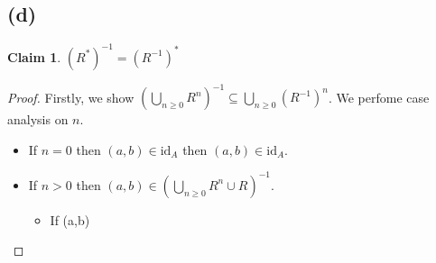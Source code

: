 \documentclass[autodetect-enginem]{article}
\theoremstyle{plain}
\theoremstyle{definition}
\theoremstyle{definition}
\newtheorem{claim}{Claim}
\begin{document}
\subsection*{(d)}
    \begin{claim}
        $(R^*)^{-1} = (R^{-1})^{*}$
    \end{claim}
    \begin{proof}
        Firstly, we show $(\bigcup_{n \geq 0} R^n)^{-1} \subseteq \bigcup_{n \geq 0} (R^{-1})^n$.
        We perfome case analysis on $n$.
        \begin{itemize}
            \item If $n=0$ then $(a,b) \in \mathrm{id}_A$ then $(a,b) \in \mathrm{id}_A$.
            \item If $n>0$ then $(a,b) \in (\bigcup_{n \geq 0} R^{n} \cup R)^{-1}$.
                \begin{itemize}
                    \item If (a,b) \in 
                \end{itemize}
        \end{itemize}
    \end{proof}
\end{document}
